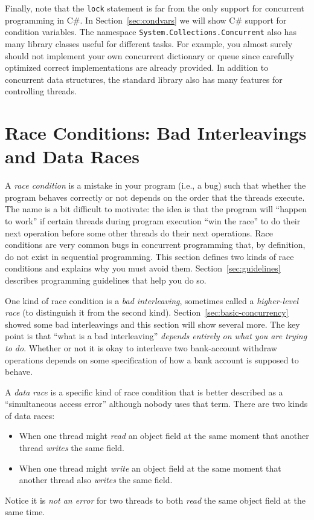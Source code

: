 \documentclass[10pt]{article}
\begin{document}
Finally, note that the {\tt lock} statement is far from the only
support for concurrent programming in C\#.  In
Section~\ref{sec:condvars} we will show C\# support for condition
variables.  The namespace {\tt System.Collections.Concurrent} also has many
library classes useful for different tasks.  For example, you almost
surely should not implement your own concurrent dictionary or queue
since carefully optimized correct implementations are already
provided.  In addition to concurrent data structures, the standard
library also has many features for controlling threads.

\section{Race Conditions: Bad Interleavings and Data Races}
\label{sec:races}

A \emph{race condition} is a mistake in your program (i.e., a bug)
such that whether the program behaves correctly or not depends on the
order that the threads execute.  The name is a bit difficult to
motivate: the idea is that the program will ``happen to work'' if
certain threads during program execution ``win the race'' to do their
next operation before some other threads do their next operations.
Race conditions are very common bugs in concurrent programming that,
by definition, do not exist in sequential programming.  This section
defines two kinds of race conditions and explains why you must avoid
them.  Section~\ref{sec:guidelines} describes programming guidelines
that help you do so.

One kind of race condition is a \emph{bad interleaving}, sometimes
called a \emph{higher-level race} (to distinguish it from the second
kind).  Section~\ref{sec:basic-concurrency} showed some bad interleavings
and this section will show several more.  The key point is that ``what
is a bad interleaving'' \emph{depends entirely on what you are trying
  to do}.  Whether or not it is okay to interleave two bank-account
withdraw operations depends on some specification of how a bank
account is supposed to behave.

A \emph{data race} is a specific kind of race condition that is better
described as a ``simultaneous access error'' although nobody uses that
term.  There are two kinds of data races:
\begin{itemize}
\item When one thread might \emph{read} an object field at the same moment
  that another thread \emph{writes} the same field.
\item When one thread might \emph{write} an object field at the same moment
  that another thread also \emph{writes} the same field.
\end{itemize}
Notice it is \emph{not an error} for two threads to both \emph{read}
the same object field at the same time.  
\end{document}
